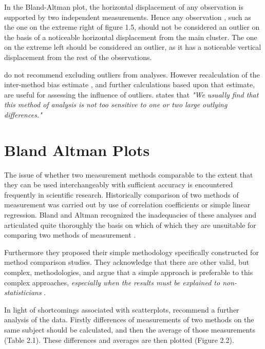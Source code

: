 \documentclass[12pt, a4paper]{report}
\theoremstyle{plain}
\theoremstyle{definition}
\theoremstyle{remark}
\begin{document}
	In the Bland-Altman plot, the horizontal displacement of any
	observation is supported by two independent measurements. Hence
	any observation , such as the one on the extreme right of figure
	1.5, should not be considered an outlier on the basis of a
	noticeable horizontal displacement from the main cluster. The one
	on the extreme left should be considered an outlier, as it has a
	noticeable vertical displacement from the rest of the
	observations.
	
	\citet*{BA99} do not recommend excluding outliers from analyses.
	However recalculation of the inter-method bias estimate , and
	further calculations based upon that estimate, are useful for
	assessing the influence of outliers.\citep{BA99} states that
	\emph{"We usually find that this method of analysis is not too
		sensitive to one or two large outlying differences."}




	\section{Bland Altman Plots}
	The issue of whether two measurement methods comparable to the
	extent that they can be used interchangeably with sufficient
	accuracy is encountered frequently in scientific research.
	Historically comparison of two methods of measurement was carried
	out by use of correlation coefficients or simple linear
	regression. Bland and Altman recognized the inadequacies of these
	analyses and articulated quite thoroughly the basis on which of
	which they are unsuitable for comparing two methods of measurement
	\citep*{BA83}.
	
	
	Furthermore they proposed their simple methodology specifically
	constructed for method comparison studies. They acknowledge that
	there are other valid, but complex, methodologies, and argue that
	a simple approach is preferable to this complex approaches,
	\emph{especially when the results must be explained to
		non-statisticians} \citep*{BA83}.
	
	\smallskip
	

	
	In light of shortcomings associated with scatterplots,
	\citet*{BA83} recommend a further analysis of the data. Firstly
	differences of measurements of two methods on the same subject
	should  be calculated, and then the average of those measurements
	(Table 2.1). These differences and averages are then plotted
	(Figure 2.2).
	
	
	
\end{document}
